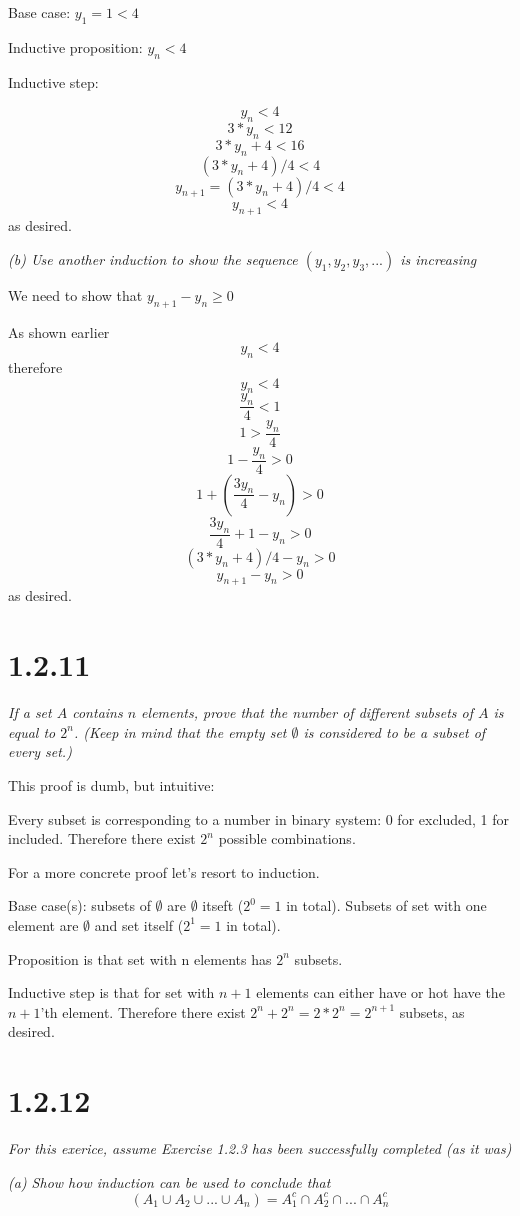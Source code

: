 \documentclass[11pt,oneside,titlepage]{book}
\begin{document}
Base case: $y_1 = 1 < 4$

Inductive proposition: $y_n < 4$

Inductive step:

$$y_n < 4$$
$$3 * y_n < 12$$
$$3 * y_n + 4 < 16$$
$$(3 * y_n + 4) / 4 < 4$$
$$y_{n + 1} =  (3 * y_n + 4) / 4 < 4$$
$$y_{n + 1} < 4$$
as desired.

\textit{(b) Use another induction to show the sequence $(y_1, y_2, y_3,...)$
  is increasing}

We need to show that $y_{n + 1} - y_n \geq 0$

As shown earlier 
$$y_n < 4$$
therefore
$$ y_n < 4$$
$$ \frac{y_n}{4} < 1$$
$$1 > \frac{y_n}{4}$$
$$1 - \frac{y_n}{4} > 0$$
$$1 + (\frac{3 y_n}{4} - y_n) > 0$$
$$\frac{3 y_n}{4} + 1 - y_n > 0$$
$$(3 * y_n + 4) / 4 - y_n  > 0$$
$$y_{n + 1} - y_n  > 0$$
as desired.

\section*{1.2.11}
\textit{If a set $A$ contains $n$ elements, prove that the number of
  different subsets of $A$ is equal to $2^n$. (Keep in mind that the empty set
  $\emptyset$ is considered to be a subset of every set.)}

This proof is dumb, but intuitive:

Every subset is corresponding to a number in binary system: 0 for excluded,
1 for included. Therefore there exist $2^n$ possible combinations.

For a more concrete proof let's resort to induction.

Base case(s): subsets of $\emptyset$ are $\emptyset$ itseft ($2^0 = 1$ in total). Subsets of
set with one element are $\emptyset$ and set itself ($2^1 = 1$ in total).

Proposition is that set with n elements has $2^n$ subsets.

Inductive step is that for set with $n + 1$ elements can either have or hot
have the $n + 1$'th element. Therefore there exist $2^n + 2^n = 2 * 2^n =
2^{n + 1}$ subsets, as desired.

\section*{1.2.12}
\textit{For this exerice, assume Exercise 1.2.3 has been successfully completed
  (as it was)}

\textit{(a) Show how induction can be used to conclude that }
$$ (A_1 \cup A_2 \cup ... \cup A_n) = A^c_1 \cap A^c_2 \cap ... \cap A^c_n$$
\end{document}
